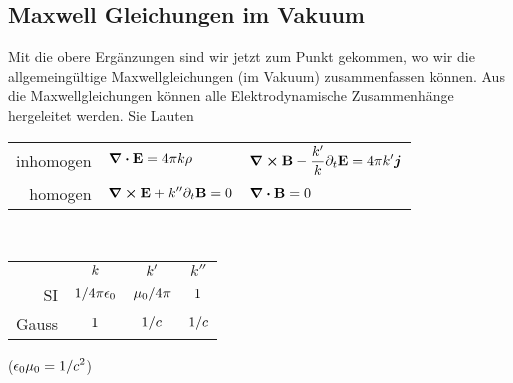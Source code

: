 \subsection{Maxwell Gleichungen im Vakuum}%
\label{sub:maxwell-gleichungen}
Mit die obere Ergänzungen sind wir jetzt zum Punkt gekommen, wo wir die allgemeingültige Maxwellgleichungen (im Vakuum) zusammenfassen können. Aus die Maxwellgleichungen können alle Elektrodynamische Zusammenhänge hergeleitet werden. Sie Lauten
\begin{center}
\begin{tabular}{rll}
  inhomogen &$\displaystyle \div \vb E=4\pi k\rho$
            &$\displaystyle \curl \vb B - \frac{k'}{k}\partial_t\vb E=4\pi k'\vb*j$\\
  homogen   &$\displaystyle \curl \vb E + k''\partial_t \vb B =0$
            &$\displaystyle \div \vb B=0$\\
\end{tabular}\\
\vspace{.2cm}
\begin{tabular}{rccc}
  & $\displaystyle k$ & $\displaystyle k'$ & $k''$\\
  SI    & $\displaystyle1/4\pi\epsilon_0$ & $\displaystyle\mu_0/4\pi$ & $\displaystyle 1$\\
  Gauss & $\displaystyle1$ & $\displaystyle1/c$ & $\displaystyle 1/c $
\end{tabular}
($\displaystyle \epsilon_0\mu_0 = 1/c^2$)
\end{center}
